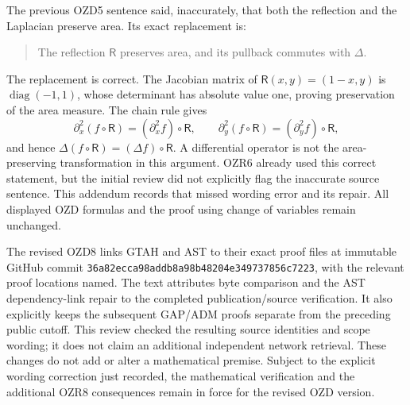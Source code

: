 The previous OZD5 sentence said, inaccurately, that both the reflection
and the Laplacian preserve area. Its exact replacement is:

\begin{quote}
The reflection \(\mathsf R\) preserves area, and its pullback commutes
with \(\Delta\).
\end{quote}

The replacement is correct. The Jacobian matrix of
\(\mathsf R(x,y)=(1-x,y)\) is \(\operatorname{diag}(-1,1)\), whose
determinant has absolute value one, proving preservation of the area
measure. The chain rule gives \[
\partial_x^2(f\circ\mathsf R)=(\partial_x^2f)\circ\mathsf R,
\qquad
\partial_y^2(f\circ\mathsf R)=(\partial_y^2f)\circ\mathsf R,
\] and hence \(\Delta(f\circ\mathsf R)=(\Delta f)\circ\mathsf R\). A
differential operator is not the area-preserving transformation in this
argument. OZR6 already used this correct statement, but the initial
review did not explicitly flag the inaccurate source sentence. This
addendum records that missed wording error and its repair. All displayed
OZD formulas and the proof using change of variables remain unchanged.

The revised OZD8 links GTAH and AST to their exact proof files at
immutable GitHub commit
\nolinkurl{36a82ecca98addb8a98b48204e349737856c7223}, with the relevant
proof locations named. The text attributes byte comparison and the AST
dependency-link repair to the completed publication/source verification.
It also explicitly keeps the subsequent GAP/ADM proofs separate from the
preceding public cutoff. This review checked the resulting source
identities and scope wording; it does not claim an additional
independent network retrieval. These changes do not add or alter a
mathematical premise. Subject to the explicit wording correction just
recorded, the mathematical verification and the additional OZR8
consequences remain in force for the revised OZD version.
